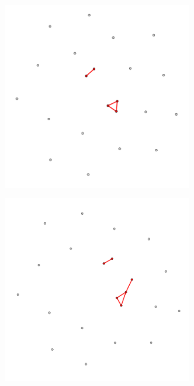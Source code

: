 \begin{figure}
\begin{subfigure}{0.3\textwidth}
        \caption{}
        \label{fig:temporal net B}
    \end{subfigure}
    \hfill
    \begin{subfigure}{0.3\textwidth}
        \centering
        \includegraphics[width=0.92\textwidth]{figures/temporal/2.png}
        \caption{}
        \label{fig:temporal net C}
    \end{subfigure}
    \hfill
    \begin{subfigure}{0.3\textwidth}
        \centering
        \includegraphics[width=0.92\textwidth]{figures/temporal/3.png}

\end{subfigure}
\end{figure}
